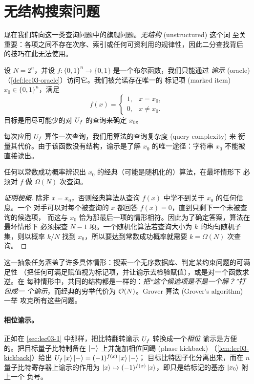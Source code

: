 \section{无结构搜索问题}
\label{sec:lec03-2}

现在我们转向这一类查询问题中的旗舰问题。\emph{无结构} (unstructured) 这个词
至关重要：各项之间不存在次序、索引或任何可资利用的规律性，因此二分查找背后
的技巧在此无法使用。

\begin{definition}[无结构搜索]
\label{def:lec03-search}
设 $N=2^{n}$，并设 $f\colon\{0,1\}^{n}\to\{0,1\}$ 是一个布尔函数，我们只能通过
\emph{谕示} (oracle)（\cref{def:lec03-oracle}）访问它。我们被允诺存在唯一的
标记项 (marked item) $x_0\in\{0,1\}^{n}$，满足
\[
  f(x)=\begin{cases}1,& x=x_0,\\ 0,& x\neq x_0.\end{cases}
\]
目标是用尽可能少的对 $U_{f}$ 的查询来确定 $x_0$。
\end{definition}

每次应用 $U_{f}$ 算作一次查询，我们用算法的查询复杂度 (query complexity) 来
衡量其代价。由于该函数没有结构，谕示是了解 $x_0$ 的唯一途径：字符串 $x_0$
不能被直接读出。

\begin{proposition}[经典下界]
\label{prop:lec03-classical}
任何以常数成功概率辨识出 $x_0$ 的经典（可能是随机化的）算法，在最坏情形下
必须对 $f$ 做 $\Omega(N)$ 次查询。
\end{proposition}

\begin{proof}[证明梗概]
除非 $x=x_0$，否则经典算法从查询 $f(x)$ 中学不到关于 $x_0$ 的任何信息。一个
对手可以对每个被查询的 $x$ 都回答 $f(x)=0$，直到只剩下一个未被查询的候选项，
而这与 $x_0$ 恰为那最后一项的情形相符。因此为了确定答案，算法在最坏情形下
必须探查 $N-1$ 项。一个随机化算法若查询大小为 $k$ 的均匀随机子集，则以概率
$k/N$ 找到 $x_0$，所以要达到常数成功概率就需要 $k=\Omega(N)$ 次查询。
\end{proof}

这一抽象任务涵盖了许多具体情形：搜索一个无序数据库、判定某约束问题的可满足性
（把任何可满足赋值视为标记项，并让谕示去检验赋值），或是对一个函数求逆。在
每种情形中，共同的结构都是一样的：\emph{把“这个候选项是不是一个解？”打包成一
个谕示}，而经典的穷举代价为 $\mathcal{O}(N)$。Grover 算法 (Grover's algorithm) 一举
攻克所有这些问题。

\paragraph{相位谕示。}
正如在 \cref{sec:lec03-1} 中那样，把比特翻转谕示 $U_{f}$ 转换成一个\emph{相位}
谕示是方便的。把目标量子比特制备在 $\ket{-}$ 上并施加相位回踢 (phase kickback)
（\cref{lem:lec03-kickback}）给出 $U_{f}\ket{x}\ket{-}=(-1)^{f(x)}\ket{x}\ket{-}$；
目标比特因子化分离出来，而在 $n$ 量子比特寄存器上谕示的作用为
$\ket{x}\mapsto(-1)^{f(x)}\ket{x}$，即只是给标记的基态 $\ket{x_0}$ 附上一个
负号。

